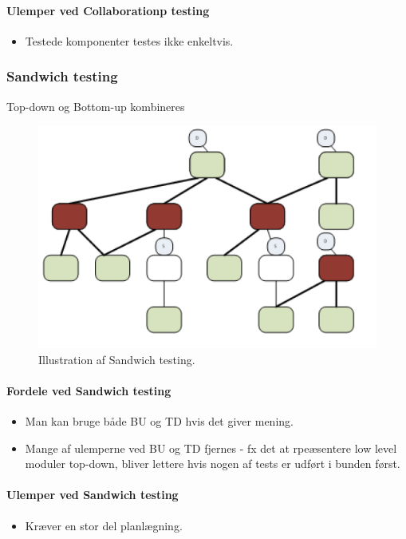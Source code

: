 \paragraph{Ulemper ved Collaborationp testing}

\begin{itemize}
	\item Testede komponenter testes ikke enkeltvis.
\end{itemize}


\subsubsection{Sandwich testing}

Top-down og Bottom-up kombineres

\begin{figure}
\centering
\includegraphics[width=0.7\linewidth]{figs/sandwich.PNG}
\caption{Illustration af Sandwich testing.}
\label{fig:sandwich}
\end{figure}

\paragraph{Fordele ved Sandwich testing}

\begin{itemize}
	\item Man kan bruge både BU og TD hvis det giver mening.
	\item Mange af ulemperne ved BU og TD fjernes - fx det at rpeæsentere low level moduler top-down, bliver lettere hvis nogen af tests er udført i bunden først.
\end{itemize}

\paragraph{Ulemper ved Sandwich testing}

\begin{itemize}
	\item Kræver en stor del planlægning.
\end{itemize}